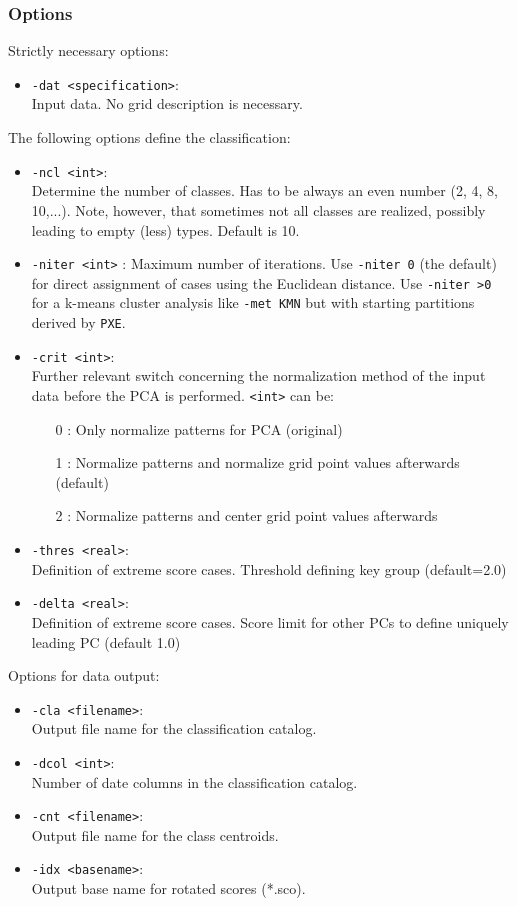 \documentclass[12pt, oneside, a4paper, headsepline, plainheadsepline]{scrbook}
\begin{document}
\subsubsection*{Options}
Strictly necessary options:
\begin{itemize}
 \item \verb+-dat <specification>+:\\ Input data. No grid description is necessary.
\end{itemize}
The following options define the classification:
\begin{itemize}
 \item \verb+-ncl <int>+:\\ Determine the number of classes. Has to be always an even number (2, 4, 8, 10,...). Note, however, that sometimes not all classes are realized, possibly leading to empty (less) types. Default is 10.
 \item \verb+-niter <int>+ : Maximum number of iterations. Use \verb+-niter 0+ (the default) for direct assignment of cases using the Euclidean distance. Use \verb+-niter >0+ for a k-means cluster analysis like \verb+-met KMN+ but with starting partitions derived by \verb+PXE+.
 \item \verb+-crit <int>+: \\Further relevant switch concerning the normalization method of the input data before the PCA is performed. \verb+<int>+ can be:
 \begin{itemize}
  \item[0]: Only normalize patterns for PCA (original)
  \item[1]: Normalize patterns and normalize grid point values afterwards (default)
  \item[2]: Normalize patterns and center grid point values afterwards
 \end{itemize}
 \item \verb+-thres <real>+: \\
	Definition of extreme score cases. Threshold defining key group (default=2.0)
 \item \verb+-delta <real>+: \\
	Definition of extreme score cases. Score limit for other PCs to define uniquely leading PC (default 1.0)
\end{itemize}
Options for data output:
\begin{itemize}
 \item \verb+-cla <filename>+:\\ Output file name for the classification catalog.
 \item \verb+-dcol <int>+:\\ Number of date columns in the classification catalog.
 \item \verb+-cnt <filename>+:\\ Output file name for the class centroids.
 \item \verb+-idx <basename>+:\\ Output base name for rotated scores (*.sco).
\end{itemize}
\end{document}
